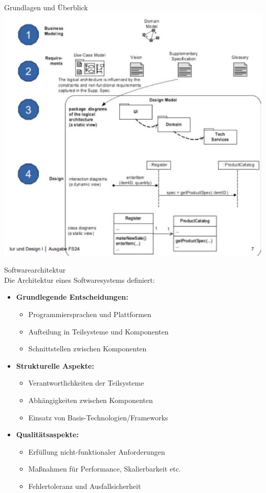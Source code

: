 \begin{concept}{Grundlagen und Überblick}
\includegraphics[width=\linewidth]{images/2024_12_29_0d1d7b5551ea1b4b41bdg-07(2)}
\end{concept}

\begin{definition}{Softwarearchitektur}\\
Die Architektur eines Softwaresystems definiert:

\begin{itemize}
    \item \textbf{Grundlegende Entscheidungen:}
    \begin{itemize}
        \item Programmiersprachen und Plattformen
        \item Aufteilung in Teilsysteme und Komponenten
        \item Schnittstellen zwischen Komponenten
    \end{itemize}
    
    \item \textbf{Strukturelle Aspekte:}
    \begin{itemize}
        \item Verantwortlichkeiten der Teilsysteme
        \item Abhängigkeiten zwischen Komponenten
        \item Einsatz von Basis-Technologien/Frameworks
    \end{itemize}
    
    \item \textbf{Qualitätsaspekte:}
    \begin{itemize}
        \item Erfüllung nicht-funktionaler Anforderungen
        \item Maßnahmen für Performance, Skalierbarkeit etc.
        \item Fehlertoleranz und Ausfallsicherheit
    \end{itemize}
\end{itemize}
\end{definition}

